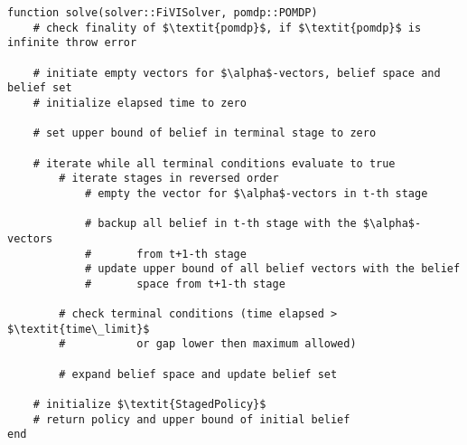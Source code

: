 \begin{samepage}
\begin{verbatim}
function solve(solver::FiVISolver, pomdp::POMDP)
    # check finality of $\textit{pomdp}$, if $\textit{pomdp}$ is infinite throw error

    # initiate empty vectors for $\alpha$-vectors, belief space and belief set
    # initialize elapsed time to zero
    
    # set upper bound of belief in terminal stage to zero
    
    # iterate while all terminal conditions evaluate to true
        # iterate stages in reversed order
            # empty the vector for $\alpha$-vectors in t-th stage

            # backup all belief in t-th stage with the $\alpha$-vectors 
            #       from t+1-th stage
            # update upper bound of all belief vectors with the belief 
            #       space from t+1-th stage
            
        # check terminal conditions (time elapsed > $\textit{time\_limit}$ 
        #           or gap lower then maximum allowed)
        
        # expand belief space and update belief set
        
    # initialize $\textit{StagedPolicy}$
    # return policy and upper bound of initial belief
end
\end{verbatim}
\end{samepage}
